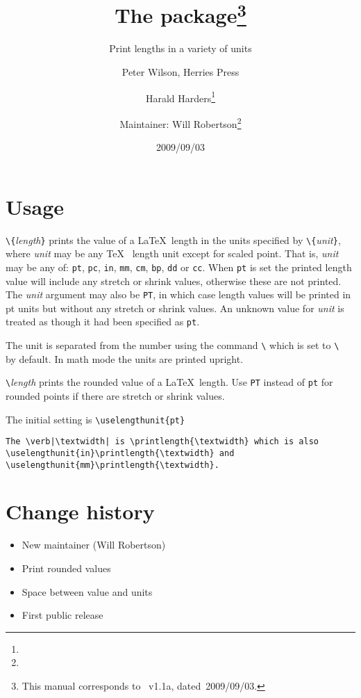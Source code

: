 \documentclass[pagesize=auto, fontsize=12pt, DIV=10]{scrartcl}
\title{The \pkg{printlen} package\thanks{This manual corresponds to \pkg{printlen.sty}~v1.1a, dated~2009/09/03.}}
\subtitle{Print lengths in a variety of units}
\author{Peter Wilson, Herries Press\and Harald Harders\thanks{\mail{h.harders@tu-bs.de}}\and Maintainer: Will Robertson\thanks{\mail{will.robertson.@latex-project.org}}}
\date{2009/09/03}
\makeatletter
\newcommand*{\cs}[1]{\texttt{\textbackslash#1}}
\newcommand*{\cmd}[1]{\cs{\expandafter\@gobble\string#1}}
\newcommand*{\meta}[1]{\textlangle\textsl{#1}\textrangle}
\newcommand*{\marg}[1]{\texttt{\{}\meta{#1}\texttt{\}}}
\makeatother
\begin{document}
\maketitle


\section{Usage}

\cmd{\printlength}\marg{length} prints the value of a \LaTeX\ length in the 
units specified by \cmd{\uselengthunit}\marg{unit}, where \meta{unit} may be any \TeX\ %
length unit except for scaled point. That is, \meta{unit} may be any of:
\texttt{pt}, \texttt{pc}, \texttt{in}, \texttt{mm}, \texttt{cm}, \texttt{bp}, \texttt{dd} or \texttt{cc}. When \texttt{pt} is set the printed length
value will include any stretch or shrink values, otherwise these
are not printed. The \meta{unit} argument may also be \texttt{PT}, in which case
length values will be printed in pt units but without any stretch
or shrink values. An unknown value for \meta{unit} is treated as though it
had been specified as \texttt{pt}.

The unit is separated from the number using the command
\cmd{\unitspace} which is set to \cmd{\,} by default. In math mode the units are
printed upright.

\cmd{\rndprintlength}\meta{length} prints the rounded value of a \LaTeX\ length.
Use \texttt{PT} instead of \texttt{pt} for rounded points if there are stretch or
shrink values.

The initial setting is \verb+\uselengthunit{pt}+



\begin{lstlisting}
The \verb|\textwidth| is \printlength{\textwidth} which is also
\uselengthunit{in}\printlength{\textwidth} and
\uselengthunit{mm}\printlength{\textwidth}.
\end{lstlisting}


\section{Change history}


\begin{itemize}
\item New maintainer (Will Robertson)
\end{itemize}
 


\begin{itemize}
\item Print rounded values
\item Space between value and units
\end{itemize}



\begin{itemize}
\item First public release
\end{itemize}
\end{document}
